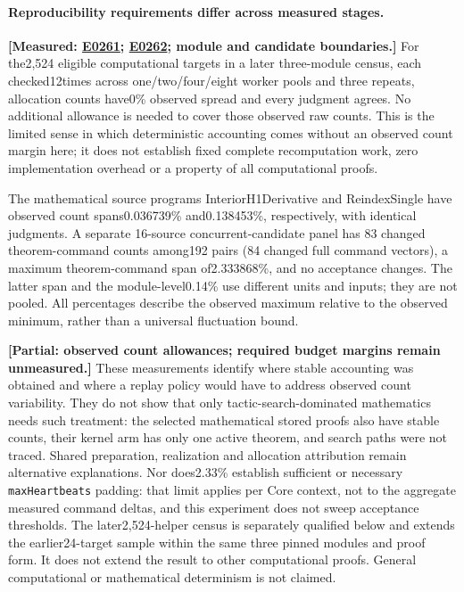 \documentclass[10pt,twocolumn]{article}
\newcommand{\measured}[1]{\textbf{[Measured: #1]}}
\newcommand{\partialev}[1]{\textbf{[Partial: #1]}}
\newcommand{\expref}[2]{\href{https://github.com/yunwei37/proofserve/blob/main/docs/tmp/build-and-evaluate/step-#1/step-report.md}{E#2}}
\begin{document}
\paragraph{Reproducibility requirements differ across measured stages.}
\measured{\expref{0261-20261102T023802+0000}{0261}; \expref{0262-20261102T030442+0000}{0262}; module and candidate boundaries.}
For the2,524 eligible computational targets in a later three-module census,
each checked12times across one/two/four/eight worker pools and three repeats,
allocation counts have0\% observed spread and every judgment agrees.
No additional allowance is needed to cover those observed raw counts.
This is the limited sense in which deterministic accounting comes without
an observed count margin here; it does not establish fixed complete
recomputation work, zero implementation overhead or a property of all
computational proofs.

The mathematical source programs InteriorH1Derivative and ReindexSingle
have observed count spans0.036739\% and0.138453\%, respectively, with
identical judgments. A separate 16-source concurrent-candidate panel has
83 changed theorem-command counts among192 pairs (84 changed full command
vectors), a maximum theorem-command span of2.333868\%, and no acceptance
changes. The latter span and the module-level0.14\% use different units
and inputs; they are not pooled.
All percentages describe the observed maximum relative to the observed
minimum, rather than a universal fluctuation bound.

\partialev{observed count allowances; required budget margins remain unmeasured.}
These measurements identify where stable accounting was obtained and
where a replay policy would have to address observed count variability.
They do not show that only tactic-search-dominated mathematics needs
such treatment: the selected mathematical stored proofs also have stable
counts, their kernel arm has only one active theorem, and search paths
were not traced. Shared preparation, realization and allocation attribution
remain alternative explanations.
Nor does2.33\% establish sufficient or necessary \texttt{maxHeartbeats}
padding: that limit applies per Core context, not to the aggregate measured
command deltas, and this experiment does not sweep acceptance thresholds.
The later2,524-helper census is separately qualified below and extends
the earlier24-target sample within the same three pinned modules and proof
form. It does not extend the result to other computational proofs.
General computational or mathematical determinism is not claimed.
\end{document}
